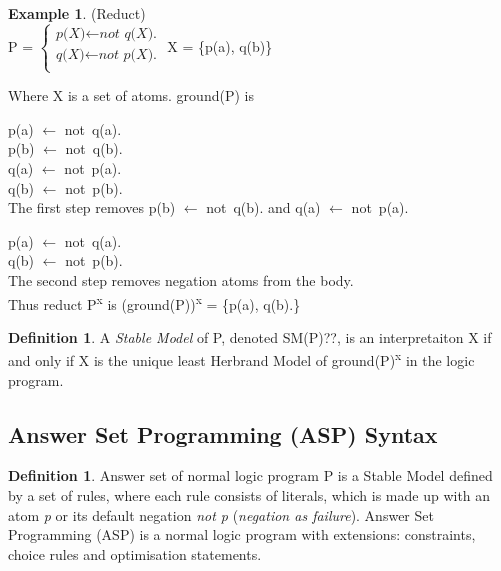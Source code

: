 \documentclass[12pt,twoside]{report}
\theoremstyle{plain}
\theoremstyle{definition}
\newtheorem{defn}[thm]{Definition} %
\newtheorem{examp}{Example}[section]
\begin{document}
\begin{examp} \normalfont (Reduct) \\

P = $\begin{cases}
	\textit{p(X)}  \leftarrow \textit{not q(X).} \\
  	\textit{q(X)} \leftarrow \textit{not p(X).} \\
      \end{cases}$  X = \{p(a), q(b)\}

Where X is a set of atoms. ground(P) is

p(a)  $\leftarrow$ not\ q(a). \\
p(b)  $\leftarrow$ not\ q(b). \\
q(a) $\leftarrow$ not\ p(a). \\
q(b) $\leftarrow$ not\ p(b). \\

 The first step removes p(b)  $\leftarrow$ not\ q(b). and q(a) $\leftarrow$ not\ p(a).

p(a)  $\leftarrow$ not\ q(a). \\
q(b) $\leftarrow$ not\ p(b). \\

The second step removes negation atoms from the body. \\
Thus reduct P\textsuperscript{x} is (ground(P))\textsuperscript{x} =  \{p(a), q(b).\}
\end{examp}
\label{reduct}

\begin{defn}
A \textit{Stable Model} of P, denoted SM(P)??, is an interpretaiton X if and only if X is the unique least Herbrand Model of ground(P)\textsuperscript{x} in the logic program.
\end{defn}

\subsection{Answer Set Programming (ASP) Syntax}

\begin{defn}
Answer set of normal logic program P is a Stable Model defined by a set of rules, where each rule consists of literals, which is made up with an atom \textit{p} or its default negation \textit{not p} (\textit{negation as failure}). Answer Set Programming (ASP) is a normal logic program with extensions: constraints, choice rules and optimisation statements.
\end{defn}
\end{document}
